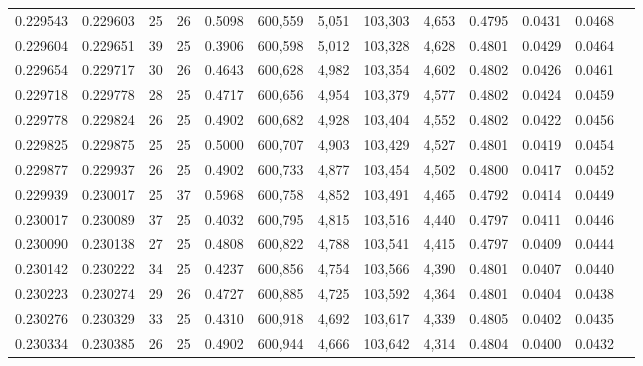 \begin{tabular}{rrrrrrrrrrrrr}
0.229543 & 0.229603 &  25 &  26 &                                     0.5098 & 600,559 &   5,051 & 103,303 &   4,653 & 0.4795 & 0.0431 & 0.0468 \\
0.229604 & 0.229651 &  39 &  25 &                                     0.3906 & 600,598 &   5,012 & 103,328 &   4,628 & 0.4801 & 0.0429 & 0.0464 \\
0.229654 & 0.229717 &  30 &  26 &                                     0.4643 & 600,628 &   4,982 & 103,354 &   4,602 & 0.4802 & 0.0426 & 0.0461 \\
0.229718 & 0.229778 &  28 &  25 &                                     0.4717 & 600,656 &   4,954 & 103,379 &   4,577 & 0.4802 & 0.0424 & 0.0459 \\
0.229778 & 0.229824 &  26 &  25 &                                     0.4902 & 600,682 &   4,928 & 103,404 &   4,552 & 0.4802 & 0.0422 & 0.0456 \\
0.229825 & 0.229875 &  25 &  25 &                                     0.5000 & 600,707 &   4,903 & 103,429 &   4,527 & 0.4801 & 0.0419 & 0.0454 \\
0.229877 & 0.229937 &  26 &  25 &                                     0.4902 & 600,733 &   4,877 & 103,454 &   4,502 & 0.4800 & 0.0417 & 0.0452 \\
0.229939 & 0.230017 &  25 &  37 &                                     0.5968 & 600,758 &   4,852 & 103,491 &   4,465 & 0.4792 & 0.0414 & 0.0449 \\
0.230017 & 0.230089 &  37 &  25 &                                     0.4032 & 600,795 &   4,815 & 103,516 &   4,440 & 0.4797 & 0.0411 & 0.0446 \\
0.230090 & 0.230138 &  27 &  25 &                                     0.4808 & 600,822 &   4,788 & 103,541 &   4,415 & 0.4797 & 0.0409 & 0.0444 \\
0.230142 & 0.230222 &  34 &  25 &                                     0.4237 & 600,856 &   4,754 & 103,566 &   4,390 & 0.4801 & 0.0407 & 0.0440 \\
0.230223 & 0.230274 &  29 &  26 &                                     0.4727 & 600,885 &   4,725 & 103,592 &   4,364 & 0.4801 & 0.0404 & 0.0438 \\
0.230276 & 0.230329 &  33 &  25 &                                     0.4310 & 600,918 &   4,692 & 103,617 &   4,339 & 0.4805 & 0.0402 & 0.0435 \\
0.230334 & 0.230385 &  26 &  25 &                                     0.4902 & 600,944 &   4,666 & 103,642 &   4,314 & 0.4804 & 0.0400 & 0.0432 \\

\end{tabular}
